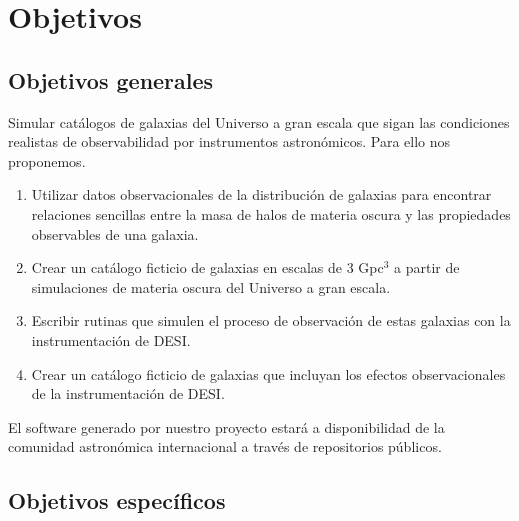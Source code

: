 \section{Objetivos}

\subsection{Objetivos generales} 

Simular cat\'alogos de galaxias del Universo a gran escala que sigan
las condiciones realistas de observabilidad por instrumentos astron\'omicos. 
Para ello nos proponemos.


\begin{enumerate}
\item  Utilizar datos observacionales de la distribuci\'on de galaxias
  para encontrar relaciones sencillas entre la masa de halos de
  materia oscura y las  propiedades observables de una galaxia.
\item Crear un cat\'alogo ficticio de galaxias en escalas de $3$ Gpc$^3$
  a partir de simulaciones de materia oscura del Universo a gran escala.
\item Escribir rutinas que simulen el proceso de observaci\'on de
  estas galaxias con la instrumentaci\'on de DESI.
\item Crear un cat\'alogo ficticio de galaxias que incluyan los
  efectos observacionales de la instrumentaci\'on de DESI.
\end{enumerate}

El software generado por nuestro proyecto estar\'a a
disponibilidad  de la comunidad astron\'omica internacional a trav\'es
de repositorios p\'ublicos. 

\subsection{Objetivos espec\'ificos}


